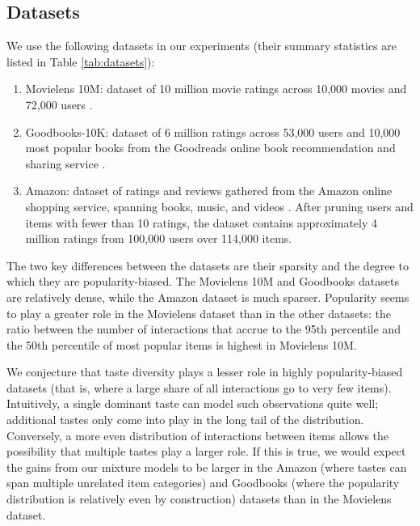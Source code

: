 \documentclass[sigconf]{acmart}
\begin{document}

\subsection{Datasets}
We use the following datasets in our experiments (their summary statistics are listed in Table \ref{tab:datasets}):

\begin{enumerate}
\item Movielens 10M: dataset of 10 million movie ratings across 10,000 movies and 72,000 users \citep{harper2016movielens}.
\item Goodbooks-10K: dataset of 6 million ratings across 53,000 users and 10,000 most popular books from the Goodreads online book recommendation and sharing service \citep{goodbooks2017}.
\item Amazon: dataset of ratings and reviews gathered from the Amazon online shopping service, spanning books, music, and videos \citep{leskovec2007dynamics}. After pruning users and items with fewer than 10 ratings, the dataset contains approximately 4 million ratings from 100,000 users over 114,000 items.
\end{enumerate}
The two key differences between the datasets are their sparsity and the degree to which they are popularity-biased. The Movielens 10M and Goodbooks datasets are relatively dense, while the Amazon dataset is much sparser. Popularity seems to play a greater role in the Movielens dataset than in the other datasets: the ratio between the number of interactions that accrue to the 95th percentile and the 50th percentile of most popular items is highest in Movielens 10M.

We conjecture that taste diversity plays a lesser role in highly popularity-biased datasets (that is, where a large share of all interactions go to very few items). Intuitively, a single dominant taste can model such observations quite well; additional tastes only come into play in the long tail of the distribution. Conversely, a more even distribution of interactions between items allows the possibility that multiple tastes play a larger role. If this is true, we would expect the gains from our mixture models to be larger in the Amazon (where tastes can span multiple unrelated item categories) and Goodbooks (where the popularity distribution is relatively even by construction) datasets than in the Movielens dataset.
\end{document}
